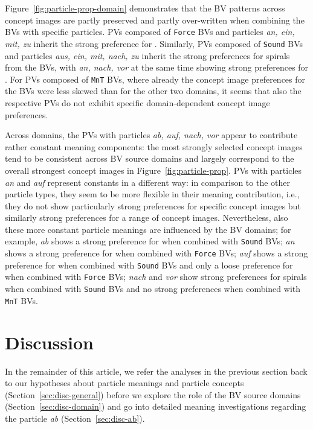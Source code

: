 \documentclass[output=paper]{langsci/langscibook}
\begin{document}
Figure~\ref{fig:particle-prop-domain} demonstrates that the BV
patterns across concept images are partly preserved and partly
over-written when combining the BVs with specific particles. PVs
composed of \texttt{Force} BVs and particles \textit{an, ein, mit, zu}
inherit the strong preference for . Similarly, PVs
composed of \texttt{Sound} BVs and particles \textit{aus, ein, mit,
  nach, zu} inherit the strong preferences for spirals from the BVs,
with \textit{an, nach, vor} at the same time showing strong
preferences for . For PVs composed of \texttt{MnT}
BVs, where already the concept image preferences for the BVs were less
skewed than for the other two domains, it seems that also the
respective PVs do not exhibit specific domain-dependent concept image
preferences.

Across domains, the PVs with particles \textit{ab, auf, nach, vor}
appear to contribute rather constant meaning components: the most
strongly selected concept images tend to be consistent across BV source domains
and largely correspond to the overall strongest concept images in
Figure~\ref{fig:particle-prop}. PVs with particles \textit{an} and
\textit{auf} represent constants in a different way: in comparison to
the other particle types, they seem to be more flexible in their
meaning contribution, i.e., they do not show particularly strong
preferences for specific concept images but similarly strong preferences for a
range of concept images.  Nevertheless, also these more constant particle
meanings are influenced by the BV domains; for example, \textit{ab}
shows a strong preference for  when combined with
\texttt{Sound} BVs; \textit{an} shows a strong preference for
 when combined with \texttt{Force} BVs; \textit{auf}
shows a strong preference for  when combined with
\texttt{Sound} BVs and only a loose preference for
 when combined with \texttt{Force} BVs;
\textit{nach} and \textit{vor} show strong preferences for spirals
when combined with \texttt{Sound} BVs and no strong preferences when
combined with \texttt{MnT} BVs.


\section{Discussion}
\label{sec:2discussion}

In the remainder of this article, we refer the analyses in the
previous section back to our hypotheses about particle meanings and
particle concepts (Section~\ref{sec:disc-general}) before we explore
the role of the BV source domains (Section~\ref{sec:disc-domain}) and
go into detailed meaning investigations regarding the particle
\textit{ab} (Section~\ref{sec:disc-ab}).
\end{document}
